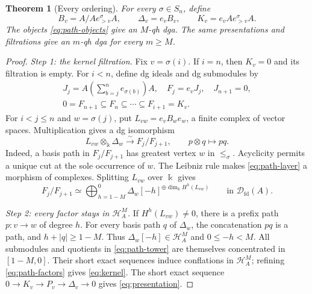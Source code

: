 \documentclass[11pt,a4paper]{article}
\newcommand{\D}{\mathcal D}
\renewcommand{\H}{\mathcal H}
\newcommand{\std}{\Delta}
\DeclareMathOperator{\fd}{fd}
\theoremstyle{plain}
\newtheorem{theorem}{Theorem}[section]
\theoremstyle{definition}
\numberwithin{equation}{section}
\begin{document}
\begin{theorem}[Every ordering]\label{thm:paths}
For every $\sigma\in S_n$, define
\begin{equation}\label{eq:path-objects}
 B_v=A/Ae_{>v}^\sigma A,\qquad
 \std_v=e_vB_v,\qquad K_v=e_vAe_{>v}^\sigma A.
\end{equation}
The objects \eqref{eq:path-objects} give an $M$-qh dga.
The same presentations and filtrations give an $m$-qh dga
for every $m\geq M$.
\end{theorem}
\begin{proof}
\noindent\textit{Step 1: the kernel filtration.}
Fix $v=\sigma(i)$. If $i=n$, then $K_v=0$ and its filtration is empty.
For $i<n$, define dg ideals and dg submodules by
\begin{equation}\label{eq:path-tower}
 \begin{gathered}
 J_j=A\left(\sum_{b=j}^n e_{\sigma(b)}\right)A,\quad
 F_j=e_vJ_j,\quad J_{n+1}=0,\\
 0=F_{n+1}\subseteq F_n\subseteq\cdots\subseteq F_{i+1}=K_v.
 \end{gathered}
\end{equation}
For $i<j\leq n$ and $w=\sigma(j)$, put $L_{vw}=e_vB_we_w$,
a finite complex of vector spaces. Multiplication gives a dg
isomorphism
\begin{equation}\label{eq:path-layer}
 L_{vw}\otimes_{\Bbbk}\std_w
 \xrightarrow{\sim}F_j/F_{j+1},\qquad p\otimes q\longmapsto pq.
\end{equation}
Indeed, a basis path in $F_j/F_{j+1}$ has greatest vertex $w$ in
$\leq_\sigma$. Acyclicity permits a unique cut at the sole occurrence
of $w$. The Leibniz rule makes \eqref{eq:path-layer} a morphism of
complexes. Splitting $L_{vw}$ over $\Bbbk$ gives
\begin{equation}\label{eq:path-factors}
 F_j/F_{j+1}\simeq
 \bigoplus_{h=1-M}^{0}
 \std_w[-h]^{\oplus\dim_{\Bbbk}H^h(L_{vw})}
 \qquad\text{in }\D_{\fd}(A).
\end{equation}

\noindent\textit{Step 2: every factor stays in $\H_A^M$.}
If $H^h(L_{vw})\neq0$, there is a prefix path $p:v\to w$ of degree
$h$. For every basis path $q$ of $\std_w$, the concatenation $pq$ is
a path, and $h+|q|\geq1-M$. Thus
$\std_w[-h]\in\H_A^M$ and $0\leq-h<M$.
All submodules and quotients in \eqref{eq:path-tower} are themselves
concentrated in $[1-M,0]$. Their short exact sequences induce
conflations in $\H_A^M$; refining \eqref{eq:path-factors} gives
\eqref{eq:kernel}. The short exact sequence
$0\to K_v\to P_v\to\std_v\to0$ gives \eqref{eq:presentation}.


\end{proof}
\end{document}

